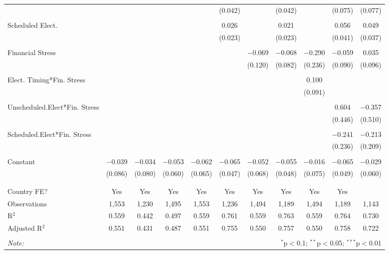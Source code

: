 \begin{table}[!htbp]
\begin{tabular}{@{\extracolsep{5pt}}lcccccccccc}
  &  &  &  &  & (0.042) &  & (0.042) &  & (0.075) & (0.077) \\ 
  & & & & & & & & & & \\ 
 Scheduled Elect. &  &  &  &  & 0.026 &  & 0.021 &  & 0.056 & 0.049 \\ 
  &  &  &  &  & (0.023) &  & (0.023) &  & (0.041) & (0.037) \\ 
  & & & & & & & & & & \\ 
 Financial Stress &  &  &  &  &  & $-$0.069 & $-$0.068 & $-$0.290 & $-$0.059 & 0.035 \\ 
  &  &  &  &  &  & (0.120) & (0.082) & (0.236) & (0.090) & (0.096) \\ 
  & & & & & & & & & & \\ 
 Elect. Timing*Fin. Stress &  &  &  &  &  &  &  & 0.100 &  &  \\ 
  &  &  &  &  &  &  &  & (0.091) &  &  \\ 
  & & & & & & & & & & \\ 
 Unscheduled.Elect*Fin. Stress &  &  &  &  &  &  &  &  & 0.604 & $-$0.357 \\ 
  &  &  &  &  &  &  &  &  & (0.446) & (0.510) \\ 
  & & & & & & & & & & \\ 
 Scheduled.Elect*Fin. Stress &  &  &  &  &  &  &  &  & $-$0.241 & $-$0.213 \\ 
  &  &  &  &  &  &  &  &  & (0.236) & (0.209) \\ 
  & & & & & & & & & & \\ 
 Constant & $-$0.039 & $-$0.034 & $-$0.053 & $-$0.062 & $-$0.065 & $-$0.052 & $-$0.055 & $-$0.016 & $-$0.065 & $-$0.029 \\ 
  & (0.086) & (0.080) & (0.060) & (0.065) & (0.047) & (0.068) & (0.048) & (0.075) & (0.049) & (0.060) \\ 
  & & & & & & & & & & \\ 
\hline \\[-1.8ex] 
Country FE? & Yes & Yes & Yes & Yes & Yes & Yes & Yes & Yes & Yes &  \\ 
Observations & 1,553 & 1,230 & 1,495 & 1,553 & 1,236 & 1,494 & 1,189 & 1,494 & 1,189 & 1,143 \\ 
R$^{2}$ & 0.559 & 0.442 & 0.497 & 0.559 & 0.761 & 0.559 & 0.763 & 0.559 & 0.764 & 0.730 \\ 
Adjusted R$^{2}$ & 0.551 & 0.431 & 0.487 & 0.551 & 0.755 & 0.550 & 0.757 & 0.550 & 0.758 & 0.722 \\ 
\hline 
\hline \\[-1.8ex] 
\textit{Note:}  & \multicolumn{10}{r}{$^{*}$p$<$0.1; $^{**}$p$<$0.05; $^{***}$p$<$0.01} \\ 
\end{tabular} 
\end{table} 
